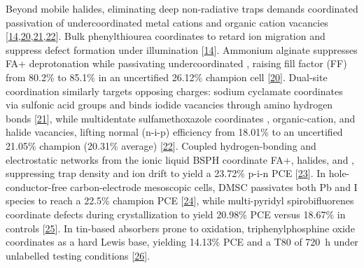 \documentclass[
  11pt,
]{article}
\begin{document}
Beyond mobile halides, eliminating deep non-radiative traps demands
coordinated passivation of undercoordinated metal cations and organic
cation vacancies
{[}\href{https://doi.org/10.1021/acsenergylett.6c02033}{14},\href{https://doi.org/10.1002/adfm.78067}{20},\href{https://doi.org/10.1021/acsami.6c10456}{21},\href{https://doi.org/10.1021/acs.jpclett.6c02253}{22}{]}.
Bulk phenylthiourea coordinates  to retard ion migration and
suppress defect formation under illumination
{[}\href{https://doi.org/10.1021/acsenergylett.6c02033}{14}{]}. Ammonium
alginate suppresses FA+ deprotonation while passivating undercoordinated
, raising fill factor (FF) from 80.2\% to 85.1\% in an
uncertified 26.12\% champion cell
{[}\href{https://doi.org/10.1002/adfm.78067}{20}{]}. Dual-site
coordination similarly targets opposing charges: sodium cyclamate
coordinates  via sulfonic acid groups and binds iodide
vacancies through amino hydrogen bonds
{[}\href{https://doi.org/10.1021/acsami.6c10456}{21}{]}, while
multidentate sulfamethoxazole coordinates , organic-cation,
and halide vacancies, lifting normal (n-i-p) efficiency from 18.01\% to
an uncertified 21.05\% champion (20.31\% average)
{[}\href{https://doi.org/10.1021/acs.jpclett.6c02253}{22}{]}. Coupled
hydrogen-bonding and electrostatic networks from the ionic liquid BSPH
coordinate FA+, halides, and , suppressing trap density and
ion drift to yield a 23.72\% p-i-n PCE
{[}\href{https://doi.org/10.1002/solr.70461}{23}{]}. In
hole-conductor-free carbon-electrode mesoscopic cells, DMSC passivates
both Pb and I species to reach a 22.5\% champion PCE
{[}\href{https://doi.org/10.1002/anie.5667084}{24}{]}, while
multi-pyridyl spirobifluorenes coordinate defects during crystallization
to yield 20.98\% PCE versus 18.67\% in controls
{[}\href{https://doi.org/10.1021/acsami.6c13903}{25}{]}. In tin-based
absorbers prone to  oxidation, triphenylphosphine oxide
coordinates  as a hard Lewis base, yielding 14.13\% PCE and a
T80 of \qty{720}{\hour} under unlabelled testing conditions
{[}\href{https://doi.org/10.1002/solr.70454}{26}{]}.
\end{document}
